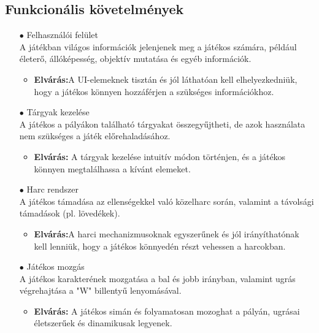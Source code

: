 \documentclass[
]{thesis-ekf}
\theoremstyle{definition}
\theoremstyle{remark}
\begin{document}
\subsection{Funkcionális követelmények}
\begin{itemize}
	\item[$\bullet$] Felhasználói felület \\A játékban világos információk jelenjenek meg a játékos számára, például életerő, állóképesség, objektív mutatása és egyéb információk.
	\begin{itemize}
		\item \textbf{Elvárás:}A UI-elemeknek tisztán és jól láthatóan kell elhelyezkedniük, hogy a játékos könnyen hozzáférjen a szükséges információkhoz.
	\end{itemize}
	\item[$\bullet$]Tárgyak kezelése\\A játékos a pályákon található tárgyakat összegyűjtheti, de azok használata nem szükséges a játék előrehaladásához.
	\begin{itemize}
		\item \textbf{Elvárás:} A tárgyak kezelése intuitív módon történjen, és a játékos könnyen megtalálhassa a kívánt elemeket.
	\end{itemize}
	\item[$\bullet$] Harc rendszer\\ A játékos támadása az ellenségekkel való közelharc során, valamint a távolsági támadások (pl. lövedékek).
	\begin{itemize}
		\item \textbf{Elvárás:}A harci mechanizmusoknak egyszerűnek és jól irányíthatónak kell lenniük, hogy a játékos könnyedén részt vehessen a harcokban.
	\end{itemize}
	\item[$\bullet$] Játékos mozgás\\ A játékos karakterének mozgatása a bal és jobb irányban, valamint ugrás végrehajtása a "W" billentyű lenyomásával.
	\begin{itemize}
		\item \textbf{Elvárás:} A játékos simán és folyamatosan mozoghat a pályán, ugrásai életszerűek és dinamikusak legyenek.
	\end{itemize}
\end{itemize}
\end{document}
